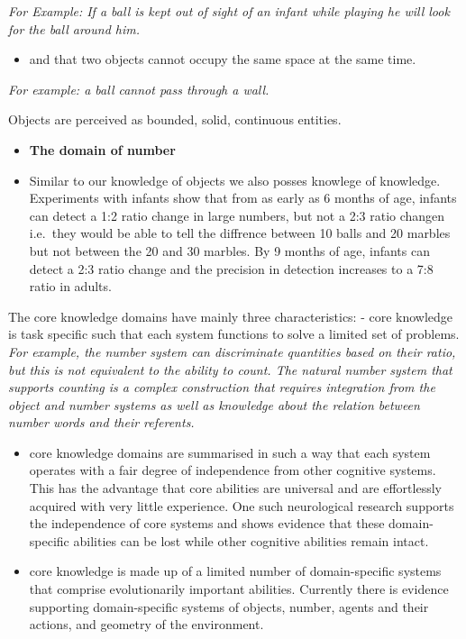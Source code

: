 \documentclass[11pt]{article}
\providecommand{\tightlist}{%
      \setlength{\itemsep}{0pt}\setlength{\parskip}{0pt}}
\begin{document}
\emph{For Example: If a ball is kept out of sight of an infant while
playing he will look for the ball around him.}

\begin{itemize}
\tightlist
\item
  and that two objects cannot occupy the same space at the same time.
\end{itemize}

\emph{For example: a ball cannot pass through a wall.}

Objects are perceived as bounded, solid, continuous entities.

\begin{itemize}
\item
  \textbf{The domain of number}
\item
  Similar to our knowledge of objects we also posses knowlege of
  knowledge. Experiments with infants show that from as early as 6
  months of age, infants can detect a 1:2 ratio change in large numbers,
  but not a 2:3 ratio changen i.e.~they would be able to tell the
  diffrence between 10 balls and 20 marbles but not between the 20 and
  30 marbles. By 9 months of age, infants can detect a 2:3 ratio change
  and the precision in detection increases to a 7:8 ratio in adults.
\end{itemize}

    The core knowledge domains have mainly three characteristics: - core
knowledge is task specific such that each system functions to solve a
limited set of problems. \emph{For example, the number system can
discriminate quantities based on their ratio, but this is not equivalent
to the ability to count. The natural number system that supports
counting is a complex construction that requires integration from the
object and number systems as well as knowledge about the relation
between number words and their referents.}

\begin{itemize}
\item
  core knowledge domains are summarised in such a way that each system
  operates with a fair degree of independence from other cognitive
  systems. This has the advantage that core abilities are universal and
  are effortlessly acquired with very little experience. One such
  neurological research supports the independence of core systems and
  shows evidence that these domain-specific abilities can be lost while
  other cognitive abilities remain intact.
\item
  core knowledge is made up of a limited number of domain-specific
  systems that comprise evolutionarily important abilities. Currently
  there is evidence supporting domain-specific systems of objects,
  number, agents and their actions, and geometry of the environment.
\end{itemize}
\end{document}
